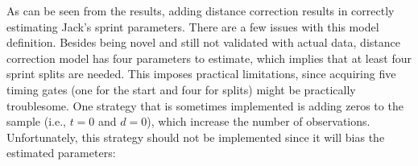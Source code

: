 \documentclass[fleqn,10pt]{wlpeerj} %
\begin{document}
\begin{table}[!h]
\centering
{}
\end{table}

\normalsize

As can be seen from the results, adding distance correction results in correctly estimating Jack's sprint parameters. There are a few issues with this model definition. Besides being novel and still not validated with actual data, distance correction model has four parameters to estimate, which implies that at least four sprint splits are needed. This imposes practical limitations, since acquiring five timing gates (one for the start and four for splits) might be practically troublesome. One strategy that is sometimes implemented is adding zeros to the sample (i.e., \(t=0\) and \(d=0\)), which increase the number of observations. Unfortunately, this strategy should not be implemented since it will bias the estimated parameters:

\small
\end{document}
